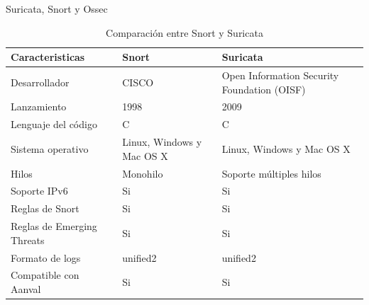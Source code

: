 \begin{subsection}{Suricata, Snort y Ossec}
\begin{table}[H]
\begin{tabular}{|m{10em}|m{11em}|m{11em}|}
            \hline 
                Caracteristicas  & Snort &  Suricata \\ 
            \hline
                Desarrollador & CISCO & Open Information Security Foundation (OISF)  \\ 
            \hline
                Lanzamiento  & 1998 & 2009 \\ 
            \hline
                Lenguaje del código & C  & C  \\
            \hline
                Sistema operativo & Linux, Windows y Mac OS X  & Linux, Windows y Mac OS X  \\
            \hline
                Hilos & Monohilo  & Soporte múltiples hilos  \\
            \hline
                Soporte IPv6 & Si  & Si  \\
            \hline
                Reglas de Snort & Si  & Si \\
            \hline
                Reglas de Emerging Threats & Si  & Si \\
            \hline
                Formato de logs & unified2  & unified2   \\
            \hline
                Compatible con Aanval & Si  & Si   \\
            \hline %
        \end{tabular}
        \caption{Comparación entre Snort y Suricata}
        \label{table:4}
    \end{table}
        
   \end{subsection}
